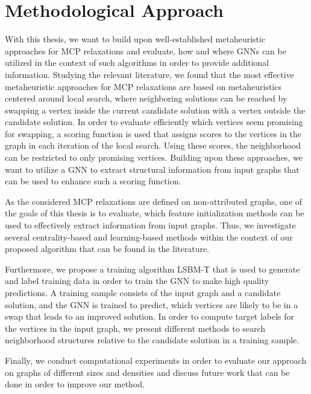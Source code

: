 \documentclass[draft,final]{vutinfth} %
\begin{document}
\section{Methodological Approach}\label{sec:methodology}
With this thesis, we want to build upon well-established metaheuristic approaches for MCP relaxations and evaluate, how and where GNNs can be utilized in the context of such algorithms in order to provide additional information. 
Studying the relevant literature, we found that the most effective metaheuristic approaches for MCP relaxations are based on metaheuristics centered around local search, where neighboring solutions can be reached by swapping a vertex inside the current candidate solution with a vertex outside the candidate solution. In order to evaluate efficiently which vertices seem promising for swapping, a scoring function is used that assigns scores to the vertices in the graph in each iteration of the local search. Using these scores, the neighborhood can be restricted to only promising vertices. 
Building upon these approaches, we want to utilize a GNN to extract structural information from input graphs that can be used to enhance such a scoring function.  

As the considered MCP relaxations are defined on non-attributed graphs, one of the goals of this thesis is to evaluate, which feature initialization methods can be used to effectively extract information from input graphs. Thus, we investigate several centrality-based and learning-based methods within the context of our proposed algorithm that can be found in the literature. 

Furthermore, we propose a training algorithm LSBM-T that is used to generate and label training data in order to train the GNN to make high quality predictions. A training sample consists of the input graph and a candidate solution, and the GNN is trained to predict, which vertices are likely to be in a swap that leads to an improved solution. In order to compute target labels for the vertices in the input graph, we present different methods to search neighborhood structures relative to the candidate solution in a training sample. 

Finally, we conduct computational experiments in order to evaluate our approach on graphs of different sizes and densities and discuss future work that can be done in order to improve our method. 
\end{document}
